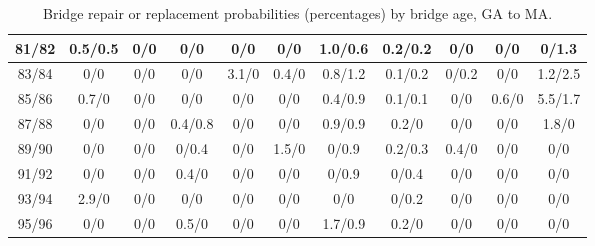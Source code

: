 \begin{table*}[htb]
\begin{tabular}{|c| c c c c c c c c c c |}
81/82&0.5/0.5& 0/0& 0/0& 0/0& 0/0& 1.0/0.6& 0.2/0.2& 0/0& 0/0& 0/1.3\\\hline
83/84&0/0& 0/0& 0/0& 3.1/0& 0.4/0& 0.8/1.2& 0.1/0.2& 0/0.2& 0/0& 1.2/2.5\\\hline
85/86&0.7/0& 0/0& 0/0& 0/0& 0/0& 0.4/0.9& 0.1/0.1& 0/0& 0.6/0& 5.5/1.7\\\hline
87/88&0/0& 0/0& 0.4/0.8& 0/0& 0/0& 0.9/0.9& 0.2/0& 0/0& 0/0& 1.8/0\\\hline
89/90&0/0& 0/0& 0/0.4& 0/0& 1.5/0& 0/0.9& 0.2/0.3& 0.4/0& 0/0& 0/0\\\hline
91/92&0/0& 0/0& 0.4/0& 0/0& 0/0& 0/0.9& 0/0.4& 0/0& 0/0& 0/0\\\hline
93/94&2.9/0& 0/0& 0/0& 0/0& 0/0& 0/0& 0/0.2& 0/0& 0/0& 0/0\\\hline
95/96&0/0& 0/0& 0.5/0& 0/0& 0/0& 1.7/0.9& 0.2/0& 0/0& 0/0& 0/0\\\hline

    \end{tabular}
    \caption{Bridge repair or replacement probabilities (percentages) by bridge age, GA to MA.}
    \label{table:states1}
\end{table*}
    

